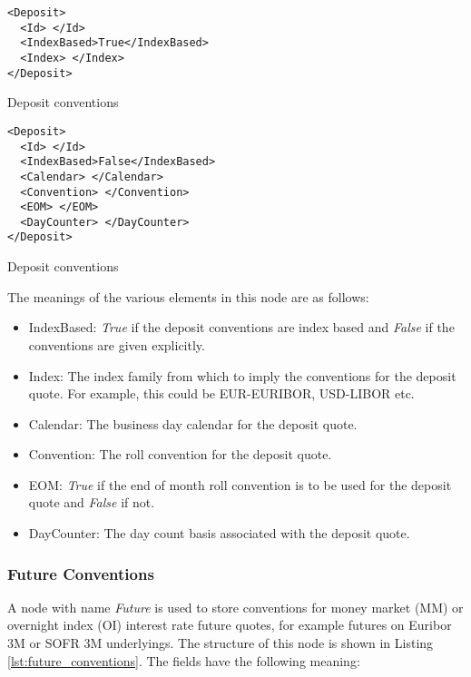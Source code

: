 \begin{listing}[H]
\begin{verbatim}
<Deposit>
  <Id> </Id>
  <IndexBased>True</IndexBased>
  <Index> </Index>
</Deposit>
\end{verbatim}
\caption{Deposit conventions}
\label{lst:deposit_conventions_index}
\end{listing}

\begin{listing}[H]
\begin{verbatim}
<Deposit>
  <Id> </Id>
  <IndexBased>False</IndexBased>
  <Calendar> </Calendar>
  <Convention> </Convention>
  <EOM> </EOM>
  <DayCounter> </DayCounter>
</Deposit>
\end{verbatim}
\caption{Deposit conventions}
\label{lst:deposit_conventions_explicit}
\end{listing}


The meanings of the various elements in this node are as follows:
\begin{itemize}
\item IndexBased: \emph{True} if the deposit conventions are index based and \emph{False} if the conventions are given
explicitly.
\item Index: The index family from which to imply the conventions for the deposit quote. For example, this could be
EUR-EURIBOR, USD-LIBOR etc.
\item Calendar: The business day calendar for the deposit quote.
\item Convention: The roll convention for the deposit quote.
\item EOM: \emph{True} if the end of month roll convention is to be used for the deposit quote and \emph{False} if not.
\item DayCounter: The day count basis associated with the deposit quote.
\end{itemize}

\subsubsection{Future Conventions}\label{ss:conventions_future}

A node with name \emph{Future} is used to store conventions for money market (MM) or overnight index (OI) interest rate
future quotes, for example futures on Euribor 3M or SOFR 3M underlyings. The structure of this node is shown in Listing
\ref{lst:future_conventions}. The fields have the following meaning:

